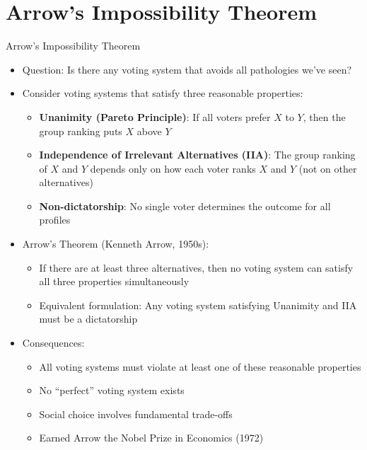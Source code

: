 \documentclass[10pt]{beamer}
\begin{document}
\section{Arrow's Impossibility Theorem}

\begin{frame}{Arrow's Impossibility Theorem}
  \begin{itemize}[<+->]
    \item Question: Is there any voting system that avoids all pathologies we've seen?
    \item Consider voting systems that satisfy three reasonable properties:
      \begin{itemize}
        \item \textbf{Unanimity (Pareto Principle)}: If all voters prefer $X$ to $Y$, then the group ranking puts $X$ above $Y$
        \item \textbf{Independence of Irrelevant Alternatives (IIA)}: The group ranking of $X$ and $Y$ depends only on how each voter ranks $X$ and $Y$ (not on other alternatives)
        \item \textbf{Non-dictatorship}: No single voter determines the outcome for all profiles
      \end{itemize}
    \item Arrow's Theorem (Kenneth Arrow, 1950s): 
      \begin{itemize}
        \item If there are at least three alternatives, then no voting system can satisfy all three properties simultaneously
        \item Equivalent formulation: Any voting system satisfying Unanimity and IIA must be a dictatorship
      \end{itemize}
    \item Consequences:
      \begin{itemize}
        \item All voting systems must violate at least one of these reasonable properties
        \item No ``perfect'' voting system exists
        \item Social choice involves fundamental trade-offs
        \item Earned Arrow the Nobel Prize in Economics (1972)
      \end{itemize}
  \end{itemize}
\end{frame}
\end{document}
